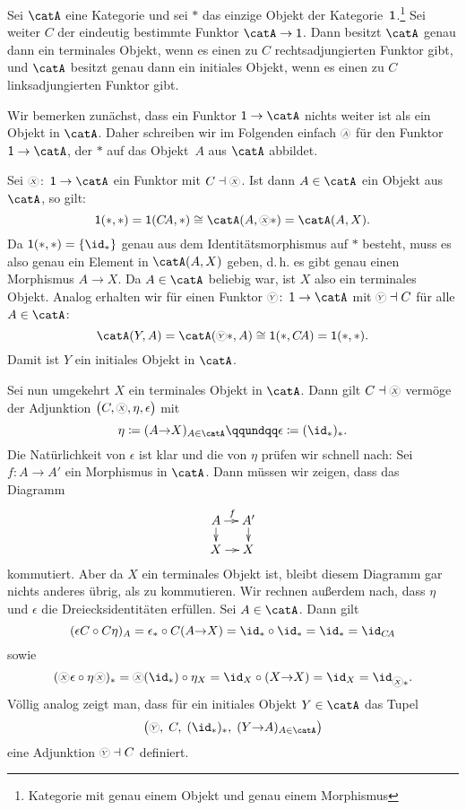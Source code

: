 \pagebreak[2]
\begin{thBeispiel}
    Sei $\catA$ eine Kategorie und sei $\ast$ das einzige Objekt der
    Kategorie~$\operatorname{\mathsf{1}}$.\footnote{Kategorie mit genau einem Objekt und genau einem
    Morphismus} Sei weiter $C$ der eindeutig bestimmte Funktor $\catA\to\One$.
    Dann besitzt $\catA$ genau dann ein terminales Objekt, wenn es einen
    zu $C$ rechtsadjungierten Funktor gibt, und $\catA$ besitzt genau dann ein
    initiales Objekt, wenn es einen zu $C$ linksadjungierten Funktor gibt.

    \newcommand{\cA}{\circledchar[black!40]{$A$}}
    \newcommand{\cX}{\circledchar[black!40]{$X$}}
    \newcommand{\cY}{\circledchar[black!40]{$Y$}}
    Wir bemerken zunächst, dass ein Funktor $\One\to\catA$ nichts weiter ist
    als ein Objekt in $\catA$. Daher schreiben wir im Folgenden einfach
    $\cA$ für den Funktor $\One\to\catA$, der $\ast$ auf das Objekt~$A$ aus
    $\catA$ abbildet.
    
    Sei $\cX\colon\One\to\catA$ ein Funktor mit $C\leftadjoint\cX$. Ist dann
    $A\in\catA$ ein Objekt aus $\catA$, so gilt:
    \[ \One(\ast,\ast) = \One(C\!A,\ast) \cong \catA(A,\cX\ast) = \catA(A,X) . \]
    Da $\One(\ast,\ast) = \{\id_\ast\}$ genau aus dem Identitätsmorphismus auf
    $\ast$ besteht, muss es also genau ein Element in $\catA(A,X)$ geben, d.\,h.
    es gibt genau einen Morphismus $A\to X$. Da $A\in\catA$ beliebig war, ist
    $X$ also ein terminales Objekt. Analog erhalten wir für einen Funktor
    $\cY\colon\One\to\catA$ mit $\cY\leftadjoint C$ für alle $A\in\catA$:
    \[ \catA(Y,A) = \catA(\cY\ast,A) \cong \One(\ast,C\!A) = \One(\ast,\ast) . \]
    Damit ist $Y$ ein initiales Objekt in $\catA$.

    Sei nun umgekehrt $X$ ein terminales Objekt in $\catA$. Dann gilt
    $C\leftadjoint\cX$ vermöge der Adjunktion
    $\bigl(C,\cX, \eta, \epsilon\bigr)$ mit 
    \[ \eta \defeq (A{\to}X)_{A\in\catA} \qqundqq \epsilon \defeq (\id_\ast)_\ast
    . \]
    Die Natürlichkeit von $\epsilon$ ist klar und die von $\eta$ prüfen wir
    schnell nach: Sei $f\colon A\to A'$ ein Morphismus in $\catA$. Dann müssen
    wir zeigen, dass das Diagramm 
    \vspace{-2mm}
    \[
        \xymatrix@=3.5mm{A \ar[r]^f \ar[d] & A' \ar[d] \\ X \ar[r] & X}
    \]
    kommutiert. Aber da $X$ ein terminales Objekt ist, bleibt diesem Diagramm
    gar nichts anderes übrig, als zu kommutieren. Wir rechnen außerdem nach,
    dass $\eta$ und $\epsilon$ die Dreiecksidentitäten erfüllen. 
    Sei $A\in\catA$. Dann gilt
    \[ (\epsilon C \after C\eta)_A 
        = \epsilon_\ast \after C(A{\to}X)
        = \id_\ast \after \id_\ast
        = \id_\ast = \id_{C\!A}
    \]
    sowie
    \[ (\cX\mkern1mu\epsilon \after \eta\mkern1mu\cX)_\ast
        = \cX(\id_\ast) \after \eta_X
        = \id_X \after (X{\to}X)
        = \id_X = \id_{\cX\ast}
    . \]
    Völlig analog zeigt man, dass für ein initiales Objekt $Y\in\catA$ das Tupel
    \[ \bigl( \cY,\; C,\; (\id_\ast)_\ast,\; (Y{\to}A)_{A\in\catA} \bigr) \]
    eine Adjunktion $\cY\leftadjoint C$ definiert.
\end{thBeispiel}

